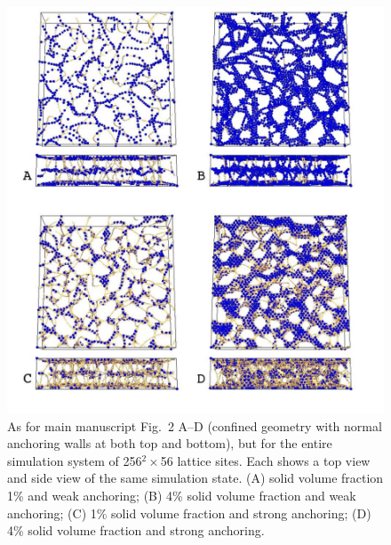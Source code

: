\documentclass[12pt,twoside]{article}
\begin{document}
\begin{figure}[t]
\begin{center}
\includegraphics[scale=0.42]{support-fig4.pdf}
\end{center}
\caption{As for main manuscript Fig.~2 A--D (confined geometry with normal
anchoring walls at both top and bottom), but for the entire simulation
system of 256$^2\times$56 lattice sites. Each shows a top view and
side view of the same simulation state. (A) solid volume fraction 1\%
and weak anchoring; (B) 4\% solid volume fraction and weak anchoring;
(C) 1\% solid volume fraction and strong anchoring; (D) 4\% solid
volume fraction and strong anchoring.}
\end{figure}
\end{document}
